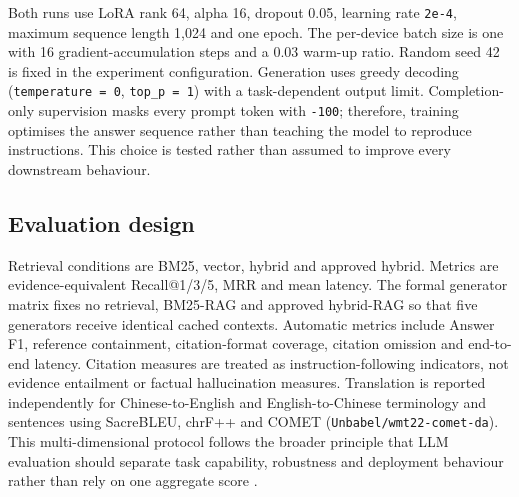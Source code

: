 Both runs use LoRA rank 64, alpha 16, dropout 0.05, learning rate \texttt{2e-4}, maximum sequence length 1,024 and one epoch. The per-device batch size is one with 16 gradient-accumulation steps and a 0.03 warm-up ratio. Random seed 42 is fixed in the experiment configuration. Generation uses greedy decoding (\texttt{temperature = 0}, \texttt{top\_p = 1}) with a task-dependent output limit. Completion-only supervision masks every prompt token with \texttt{-100}; therefore, training optimises the answer sequence rather than teaching the model to reproduce instructions. This choice is tested rather than assumed to improve every downstream behaviour.

\subsection{Evaluation design}

Retrieval conditions are BM25, vector, hybrid and approved hybrid. Metrics are evidence-equivalent Recall@1/3/5, MRR and mean latency. The formal generator matrix fixes no retrieval, BM25-RAG and approved hybrid-RAG so that five generators receive identical cached contexts. Automatic metrics include Answer F1, reference containment, citation-format coverage, citation omission and end-to-end latency. Citation measures are treated as instruction-following indicators, not evidence entailment or factual hallucination measures. Translation is reported independently for Chinese-to-English and English-to-Chinese terminology and sentences using SacreBLEU, chrF++ and COMET (\texttt{Unbabel/wmt22-comet-da}). This multi-dimensional protocol follows the broader principle that LLM evaluation should separate task capability, robustness and deployment behaviour rather than rely on one aggregate score \citep{chang2024survey}.

